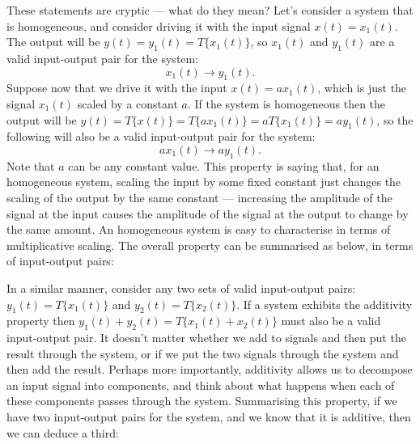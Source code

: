 \documentclass[10pt]{beamer}
\begin{document}
These statements are cryptic --- what do they mean?  Let's consider a system that is homogeneous, and consider driving it with the input signal $x(t) = x_1(t)$.  The output will be $y(t) = y_1(t) = T\{x_1(t)\}$, so $x_1(t)$ and $y_1(t)$ are a valid input-output pair for the system:
\begin{equation*}
  x_1(t) \longrightarrow y_1(t).
\end{equation*}
Suppose now that we drive it with the input $x(t) = a x_1(t)$, which is just the signal $x_1(t)$ scaled by a constant $a$.  
If the system is homogeneous then the output will be $y(t) = T \{x(t)\} = T \{a x_1(t)\} = a T \{x_1(t)\} = a y_1(t)$, so the following will also be a valid input-output pair for the system:
\begin{equation*}
  a x_1(t) \longrightarrow a y_1(t).
\end{equation*}
Note that $a$ can be any constant value.  This property is saying that, for an homogeneous system, scaling the input by some fixed constant just changes the scaling of the output by the same constant --- increasing the amplitude of the signal at the input causes the amplitude of the signal at the output to change by the same amount.  An homogeneous system is easy to characterise in terms of multiplicative scaling.  The overall property can be summarised as below, in terms of input-output pairs:
\begin{center}
\end{center}

In a similar manner, consider any two sets of valid input-output pairs:  $y_1(t) = T\{x_1(t)\}$ and $y_2(t) = T\{x_2(t)\}$.  If a system exhibits the additivity property then $y_1(t) + y_2(t) = T\{x_1(t) + x_2(t)\}$ must also be a valid input-output pair.  It doesn't matter whether we add to signals and then put the result through the system, or if we put the two signals through the system and then add the result.  Perhaps more importantly, additivity allows us to decompose an input signal into components, and think about what happens when each of these components passes through the system.  Summarising this property, if we have two input-output pairs for the system, and we know that it is additive, then we can deduce a third:
\begin{center}
\end{center}
\end{document}
